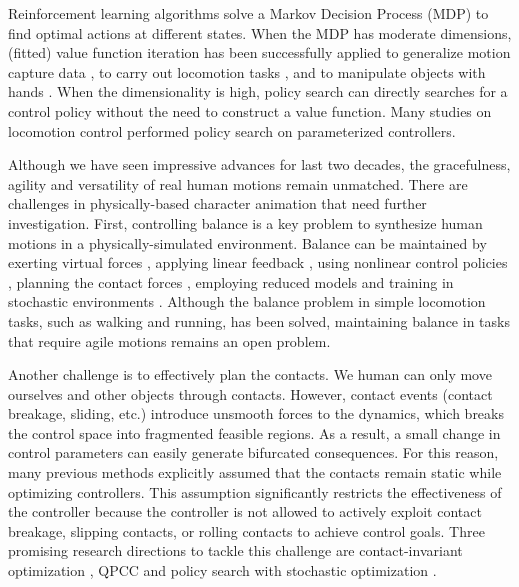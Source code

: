 Reinforcement learning algorithms solve a Markov Decision Process (MDP) to find optimal actions at different states. When the MDP has moderate dimensions, (fitted) value function iteration has been successfully applied to generalize motion capture data \cite{Treuille:2007:NCA,Levine:2012:CCC}, to carry out locomotion tasks \cite{Coros:2009:RTC}, and to manipulate objects with hands \cite{Multifinger2013}. When the dimensionality is high, policy search \cite{Ng:2000:PPS} can directly searches for a control policy without the need to construct a value function. Many studies on locomotion control \cite{Yin08,Wang:2009,Coros:2011,Wang:2012,Geijtenbeek:2013} performed policy search on parameterized controllers. 

Although we have seen impressive advances for last two decades, the gracefulness, agility and versatility of real human motions remain unmatched. There are challenges in physically-based character animation that need further investigation. First, controlling balance is a key problem to synthesize human motions in a physically-simulated environment. Balance can be maintained by exerting virtual forces \cite{Pratt2001,Coros2010}, applying linear feedback \cite{Laszlo:1996,Yin:2007,daSilva:2008,Coros2010}, using nonlinear control policies \cite{Muico:2009}, planning the contact forces \cite{Muico:2009,Tan:2012}, employing reduced models \cite{Tsai:2010,Kwon:2010,Mordatch:2010:RPL,Coros2010,Ye:2010} and training in stochastic environments \cite{Wang:2010}. Although the balance problem in simple locomotion tasks, such as walking and running, has been solved, maintaining balance in tasks that require agile motions remains an open problem. 

Another challenge is to effectively plan the contacts. We human can only move ourselves and other objects through contacts. However, contact events (contact breakage, sliding, etc.) introduce unsmooth forces to the dynamics, which breaks the control space into fragmented feasible regions. As a result, a small change in control parameters can easily generate bifurcated consequences. For this reason, many previous methods
explicitly assumed that the contacts remain static
\cite{Abe:2007,Jain:2009,Kim:2011:DCO} while optimizing controllers. This assumption significantly
restricts the effectiveness of the controller because the controller is not allowed to actively exploit contact
breakage, slipping contacts, or rolling contacts to achieve control
goals. Three promising research directions to tackle this challenge are contact-invariant optimization \cite{Mordatch:2012,Mordatch:2013}, QPCC \cite{Tan:2012} and policy search with stochastic optimization \cite{Wu:2010:TAB,Wang:2010,Mordatch:2010:RPL}.

